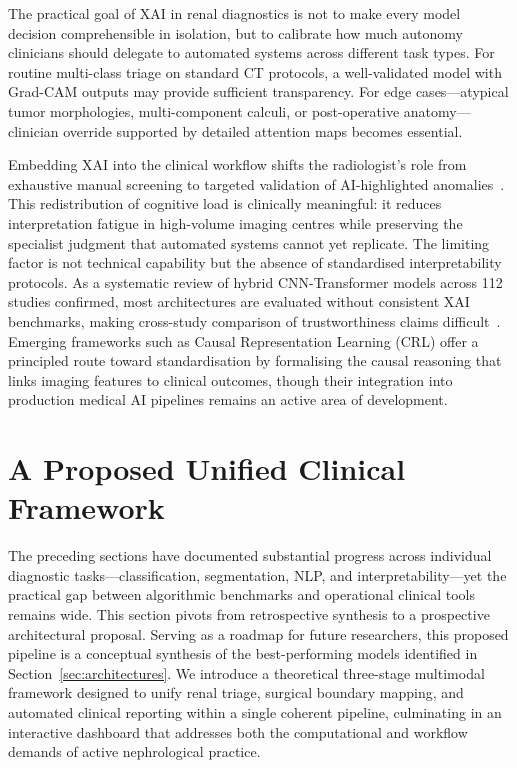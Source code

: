 \documentclass[pdflatex,sn-mathphys-num]{sn-jnl}%
\begin{document}
The practical goal of XAI in renal diagnostics is not to make every model decision comprehensible in isolation, but to calibrate how much autonomy clinicians should delegate to automated systems across different task types. For routine multi-class triage on standard CT protocols, a well-validated model with Grad-CAM outputs may provide sufficient transparency. For edge cases---atypical tumor morphologies, multi-component calculi, or post-operative anatomy---clinician override supported by detailed attention maps becomes essential.

Embedding XAI into the clinical workflow shifts the radiologist's role from exhaustive manual screening to targeted validation of AI-highlighted anomalies~\cite{abdelrahman2022deep}. This redistribution of cognitive load is clinically meaningful: it reduces interpretation fatigue in high-volume imaging centres while preserving the specialist judgment that automated systems cannot yet replicate. The limiting factor is not technical capability but the absence of standardised interpretability protocols. As a systematic review of hybrid CNN-Transformer models across 112 studies confirmed, most architectures are evaluated without consistent XAI benchmarks, making cross-study comparison of trustworthiness claims difficult~\cite{papanastasiou2024systematic}. Emerging frameworks such as Causal Representation Learning (CRL) offer a principled route toward standardisation by formalising the causal reasoning that links imaging features to clinical outcomes, though their integration into production medical AI pipelines remains an active area of development.



\section{A Proposed Unified Clinical Framework}
\label{sec:framework}

The preceding sections have documented substantial progress across individual diagnostic tasks---classification, segmentation, NLP, and interpretability---yet the practical gap between algorithmic benchmarks and operational clinical tools remains wide. This section pivots from retrospective synthesis to a prospective architectural proposal. Serving as a roadmap for future researchers, this proposed pipeline is a conceptual synthesis of the best-performing models identified in Section~\ref{sec:architectures}. We introduce a theoretical three-stage multimodal framework designed to unify renal triage, surgical boundary mapping, and automated clinical reporting within a single coherent pipeline, culminating in an interactive dashboard that addresses both the computational and workflow demands of active nephrological practice.
\end{document}
